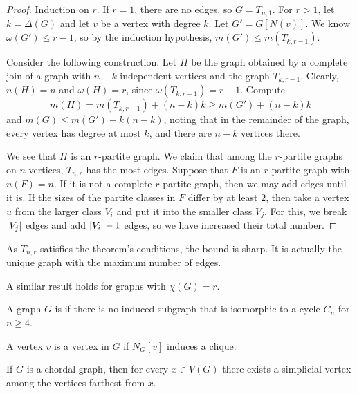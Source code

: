 \begin{proof}
  Induction on $r$.
  If $r = 1$, there are no edges, so $G = T_{n,1}$.
  For $r > 1$, let $k = \Delta(G)$ and let $v$ be a vertex with degree $k$.
  Let $G' = G[N(v)]$.
  We know $\omega(G') \le r-1$, so by the induction hypothesis, $m(G') \le
  m(T_{k,r-1})$.

  Consider the following construction.
  Let $H$ be the graph obtained by a complete join of a graph with $n-k$
  independent vertices and the graph $T_{k,r-1}$.
  Clearly, $n(H) = n$ and $\omega(H) = r$, since $\omega(T_{k,r-1}) = r-1$.
  Compute
  \[
	m(H) = m(T_{k,r-1}) + (n-k)k \ge m(G') + (n-k)k
  \]
  and $m(G) \le m(G') + k(n-k)$, noting that in the remainder of the graph,
  every vertex has degree at most $k$, and there are $n-k$ vertices there.

  We see that $H$ is an $r$-partite graph.
  We claim that among the $r$-partite graphs on $n$ vertices, $T_{n,r}$ has the
  most edges.
  Suppose that $F$ is an $r$-partite graph with $n(F) = n$.
  If it is not a complete $r$-partite graph, then we may add edges until it is.
  If the sizes of the partite classes in $F$ differ by at least $2$, then take a
  vertex $u$ from the larger class $V_i$ and put it into the smaller class
  $V_j$.
  For this, we break $\left| V_j \right|$ edges and add $\left| V_i \right|-1$ edges, so we have
  increased their total number.
\end{proof}

\begin{remark}
  As $T_{n,r}$ satisfies the theorem's conditions, the bound is sharp.
  It is actually the unique graph with the maximum number of edges.
\end{remark}

\begin{remark}
  A similar result holds for graphs with $\chi(G) = r$.
\end{remark}


\begin{definition}
  A graph $G$ is  if there is no induced subgraph that is
  isomorphic to a cycle $C_n$ for $n \ge 4$.
\end{definition}

\begin{definition}
  A vertex $v$ is a  vertex in $G$ if $N_G[v]$ induces a
  clique.
\end{definition}

\begin{lemma}[Voloshin]
  If $G$ is a chordal graph, then for every $x \in V(G)$ there exists a
  simplicial vertex among the vertices farthest from $x$.
\end{lemma}

